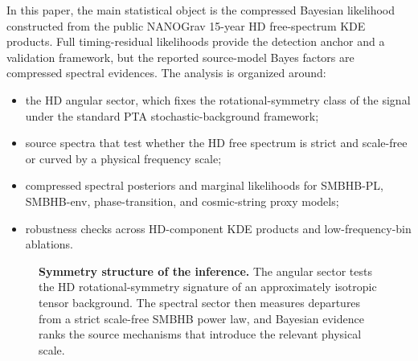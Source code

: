 \documentclass[symmetry,article,submit,pdftex,moreauthors]{Definitions/mdpi}
\begin{document}
In this paper, the main statistical object is the compressed Bayesian likelihood constructed from the public NANOGrav 15-year HD free-spectrum KDE products. Full timing-residual likelihoods provide the detection anchor and a validation framework, but the reported source-model Bayes factors are compressed spectral evidences. The analysis is organized around:
\begin{itemize}
    \item the HD angular sector, which fixes the rotational-symmetry class of the signal under the standard PTA stochastic-background framework;
    \item source spectra that test whether the HD free spectrum is strict and scale-free or curved by a physical frequency scale;
    \item compressed spectral posteriors and marginal likelihoods for SMBHB-PL, SMBHB-env, phase-transition, and cosmic-string proxy models;
    \item robustness checks across HD-component KDE products and low-frequency-bin ablations.
\end{itemize}

\begin{figure}[htbp]
    \centering
    \caption{\textbf{Symmetry structure of the inference.} The angular sector tests the HD rotational-symmetry signature of an approximately isotropic tensor background. The spectral sector then measures departures from a strict scale-free SMBHB power law, and Bayesian evidence ranks the source mechanisms that introduce the relevant physical scale.}
    \label{fig:inference-hierarchy}
\end{figure}
\end{document}
